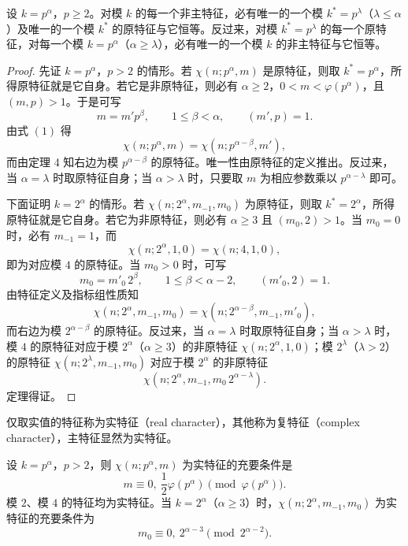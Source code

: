 \begin{theorem}[原文 定理 5]
	设 $k=p^\alpha$，$p\geq 2$。对模 $k$ 的每一个非主特征，必有唯一的一个模 $k^*=p^\lambda$（$\lambda\leq\alpha$）及唯一的一个模 $k^*$ 的原特征与它恒等。反过来，对模 $k^*=p^\lambda$ 的每一个原特征，对每一个模 $k=p^\alpha$（$\alpha\geq\lambda$），必有唯一的一个模 $k$ 的非主特征与它恒等。
\end{theorem}

\begin{proof}
	先证 $k=p^\alpha$，$p>2$ 的情形。若 $\chi(n;p^\alpha,m)$ 是原特征，则取 $k^*=p^\alpha$，所得原特征就是它自身。若它是非原特征，则必有 $\alpha\geq2$，$0<m<\varphi(p^\alpha)$，且 $(m,p)>1$。于是可写
	\[
		m=m'p^\beta,\qquad 1\leq\beta<\alpha,\qquad (m',p)=1.
	\]
	由式 \((1)\) 得
	\[
		\chi(n;p^\alpha,m)=\chi(n;p^{\alpha-\beta},m'),
	\]
	而由定理 4 知右边为模 $p^{\alpha-\beta}$ 的原特征。唯一性由原特征的定义推出。反过来，当 $\alpha=\lambda$ 时取原特征自身；当 $\alpha>\lambda$ 时，只要取 $m$ 为相应参数乘以 $p^{\alpha-\lambda}$ 即可。

	下面证明 $k=2^\alpha$ 的情形。若 $\chi(n;2^\alpha,m_{-1},m_0)$ 为原特征，则取 $k^*=2^\alpha$，所得原特征就是它自身。若它为非原特征，则必有 $\alpha\geq3$ 且 $(m_0,2)>1$。当 $m_0=0$ 时，必有 $m_{-1}=1$，而
	\[
		\chi(n;2^\alpha,1,0)=\chi(n;4,1,0),
	\]
	即为对应模 $4$ 的原特征。当 $m_0>0$ 时，可写
	\[
		m_0=m'_0\,2^\beta,\qquad 1\leq\beta<\alpha-2,\qquad (m'_0,2)=1.
	\]
	由特征定义及指标组性质知
	\[
		\chi(n;2^\alpha,m_{-1},m_0)
		=
		\chi(n;2^{\alpha-\beta},m_{-1},m'_0),
	\]
	而右边为模 $2^{\alpha-\beta}$ 的原特征。反过来，当 $\alpha=\lambda$ 时取原特征自身；当 $\alpha>\lambda$ 时，模 $4$ 的原特征对应于模 $2^\alpha$（$\alpha\geq3$）的非原特征 $\chi(n;2^\alpha,1,0)$；模 $2^\lambda$（$\lambda>2$）的原特征 $\chi(n;2^\lambda,m_{-1},m_0)$ 对应于模 $2^\alpha$ 的非原特征
	\[
		\chi(n;2^\alpha,m_{-1},m_0\,2^{\alpha-\lambda}).
	\]
	定理得证。
\end{proof}

仅取实值的特征称为实特征（real character），其他称为复特征（complex character），主特征显然为实特征。

\begin{theorem}[原文 定理 6]
	设 $k=p^\alpha$，$p>2$，则 $\chi(n;p^\alpha,m)$ 为实特征的充要条件是
	\[
		m\equiv0,\ \frac{1}{2}\varphi(p^\alpha)\pmod{\varphi(p^\alpha)}.
	\]
	模 $2$、模 $4$ 的特征均为实特征。当 $k=2^\alpha$（$\alpha\geq3$）时，$\chi(n;2^\alpha,m_{-1},m_0)$ 为实特征的充要条件为
	\[
		m_0\equiv0,\ 2^{\alpha-3}\pmod {2^{\alpha-2}}.
	\]
\end{theorem}

